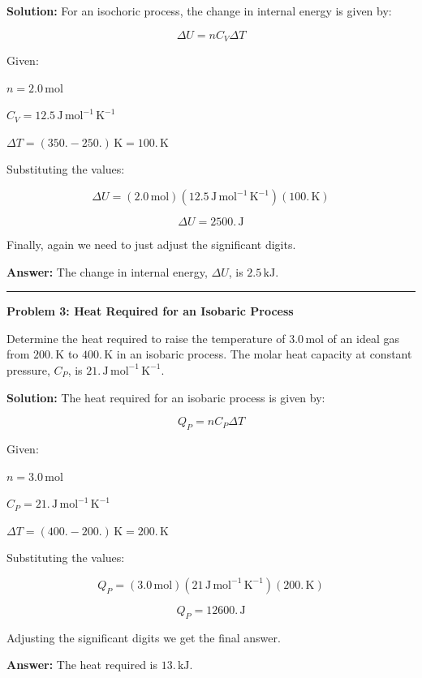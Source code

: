 \documentclass[
  9pt,
]{extbook}
\theoremstyle{definition}
\theoremstyle{definition}
\theoremstyle{definition}
\theoremstyle{definition}
\theoremstyle{remark}
\begin{document}
\textbf{Solution:} For an isochoric process, the change in internal energy is given by:

\[\Delta U = n C_V \Delta T\]

Given:

\(n = 2.0 \, \text{mol}\)

\(C_V = 12.5 \, \text{J} \, \text{mol}^{-1} \, \text{K}^{-1}\)

\(\Delta T = (350. - 250.) \, \text{K} = 100. \, \text{K}\)

Substituting the values:

\[\Delta U = (2.0\, \text{mol})(12.5\, \text{J} \, \text{mol}^{-1} \, \text{K}^{-1}) (100.\,\text{K})\]

\[\Delta U = 2500. \, \text{J}\]

Finally, again we need to just adjust the significant digits.

\textbf{Answer:} The change in internal energy, \(\Delta U\), is \(2.5 \, \text{kJ}\).

\begin{center}\rule{0.5\linewidth}{0.5pt}\end{center}

\textbf{Problem 3: Heat Required for an Isobaric Process}

Determine the heat required to raise the temperature of \(3.0 \, \text{mol}\) of an ideal gas from \(200. \, \text{K}\) to \(400. \, \text{K}\) in an isobaric process. The molar heat capacity at constant pressure, \(C_P\), is \(21. \, \text{J} \, \text{mol}^{-1} \, \text{K}^{-1}\).

\textbf{Solution:} The heat required for an isobaric process is given by:

\[Q_P = n C_P \Delta T\]

Given:

\(n = 3.0 \, \text{mol}\)

\(C_P = 21. \, \text{J} \, \text{mol}^{-1} \, \text{K}^{-1}\)

\(\Delta T = (400. - 200.) \, \text{K} = 200. \, \text{K}\)

Substituting the values:

\[Q_P = (3.0 \, \text{mol})(21 \, \text{J} \, \text{mol}^{-1} \, \text{K}^{-1})(200. \, \text{K})\]

\[Q_P = 12600. \, \text{J}\]

Adjusting the significant digits we get the final answer.

\textbf{Answer:} The heat required is \(13. \, \text{kJ}\).
\end{document}
